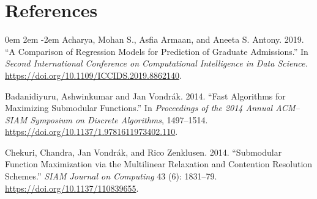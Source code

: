 \documentclass[11pt]{article} %
\theoremstyle{definition}
\begin{document}
\section{References}
\noindent 

\parskip 0em
\leftskip 2em
\parindent -2em
Acharya, Mohan S., Asfia Armaan, and Aneeta S. Antony. 2019. ``A Comparison of Regression Models for Prediction of Graduate Admissions.'' In \emph{Second International Conference on Computational Intelligence in Data Science.} \url{https://doi.org/10.1109/ICCIDS.2019.8862140}.

%
%
%
Badanidiyuru, Ashwinkumar and Jan Vondrák. 2014. ``Fast Algorithms for Maximizing Submodular Functions.'' In \emph{Proceedings of the 2014 Annual ACM--SIAM Symposium on Discrete Algorithms}, 1497--1514. \url{https://doi.org/10.1137/1.9781611973402.110}.

%
%
%
%
%
%
%
Chekuri, Chandra, Jan Vondr\'ak, and Rico Zenklusen. 2014. ``Submodular Function Maximization via the Multilinear Relaxation and Contention Resolution Schemes.'' \emph{SIAM Journal on Computing} 43 (6): 1831--79. \url{https://doi.org/10.1137/110839655}.
\end{document}
